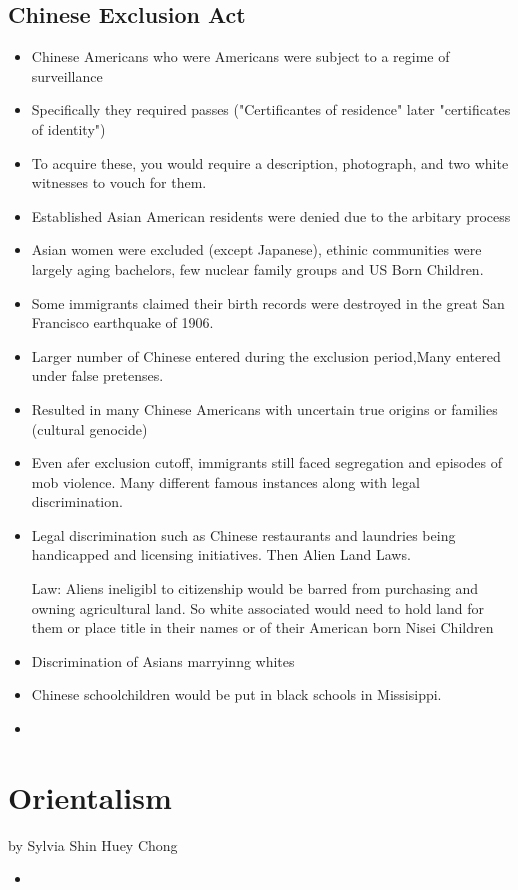 \documentclass{article}
\begin{document}
\subsection{Chinese Exclusion Act}
\begin{itemize}
  \item Chinese Americans who were Americans were subject to a regime of surveillance
  \item Specifically they required passes ("Certificantes of residence" later "certificates of identity")
  \item To acquire these, you would require a description, photograph, and two white witnesses to
    vouch for them.
  \item Established Asian American residents were denied due to the arbitary process
  \item Asian women were excluded (except Japanese), ethinic communities were largely 
    aging bachelors, few nuclear family groups and US Born Children.
  \item Some immigrants claimed their birth records were destroyed in the great San Francisco earthquake of 1906.
  \item Larger number of Chinese entered during the exclusion period,Many entered under false pretenses.
  \item Resulted in many Chinese Americans with uncertain true origins or families (cultural genocide)
  \item Even afer exclusion cutoff, immigrants still faced segregation and episodes of mob violence. 
    Many different famous instances along with legal discrimination.
  \item Legal discrimination such as Chinese restaurants and laundries being handicapped
    and licensing initiatives. Then Alien Land Laws.
    
    Law: Aliens ineligibl to citizenship would be barred from purchasing and owning agricultural land.
    So white associated would need to hold land for them or place title
    in their names or of their American born Nisei Children
  \item Discrimination of Asians marryinng whites
  \item Chinese schoolchildren would be put in black schools in Missisippi.
  \item 
\end{itemize}

\section{Orientalism}
by Sylvia Shin Huey Chong

\begin{itemize}
  \item 
\end{itemize}
\end{document}
